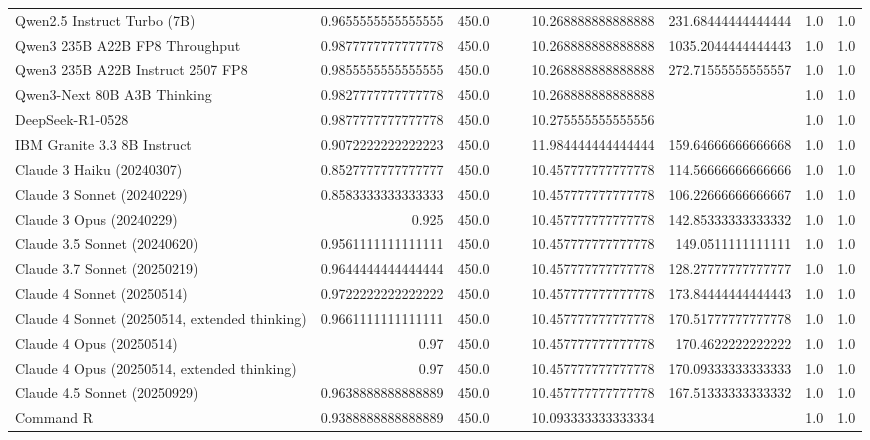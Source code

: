 \begin{table}[htp]
{\begin{tabular}{lrrrrrrrr}
Qwen2.5 Instruct Turbo (7B) & 0.9655555555555555 & 450.0 &  &  & 10.268888888888888 & 231.68444444444444 & 1.0 & 1.0 \\
Qwen3 235B A22B FP8 Throughput & 0.9877777777777778 & 450.0 &  &  & 10.268888888888888 & 1035.2044444444443 & 1.0 & 1.0 \\
Qwen3 235B A22B Instruct 2507 FP8 & 0.9855555555555555 & 450.0 &  &  & 10.268888888888888 & 272.71555555555557 & 1.0 & 1.0 \\
Qwen3-Next 80B A3B Thinking & 0.9827777777777778 & 450.0 &  &  & 10.268888888888888 &  & 1.0 & 1.0 \\
DeepSeek-R1-0528 & 0.9877777777777778 & 450.0 &  &  & 10.275555555555556 &  & 1.0 & 1.0 \\
IBM Granite 3.3 8B Instruct & 0.9072222222222223 & 450.0 &  &  & 11.984444444444444 & 159.64666666666668 & 1.0 & 1.0 \\
Claude 3 Haiku (20240307) & 0.8527777777777777 & 450.0 &  &  & 10.457777777777778 & 114.56666666666666 & 1.0 & 1.0 \\
Claude 3 Sonnet (20240229) & 0.8583333333333333 & 450.0 &  &  & 10.457777777777778 & 106.22666666666667 & 1.0 & 1.0 \\
Claude 3 Opus (20240229) & 0.925 & 450.0 &  &  & 10.457777777777778 & 142.85333333333332 & 1.0 & 1.0 \\
Claude 3.5 Sonnet (20240620) & 0.9561111111111111 & 450.0 &  &  & 10.457777777777778 & 149.0511111111111 & 1.0 & 1.0 \\
Claude 3.7 Sonnet (20250219) & 0.9644444444444444 & 450.0 &  &  & 10.457777777777778 & 128.27777777777777 & 1.0 & 1.0 \\
Claude 4 Sonnet (20250514) & 0.9722222222222222 & 450.0 &  &  & 10.457777777777778 & 173.84444444444443 & 1.0 & 1.0 \\
Claude 4 Sonnet (20250514, extended thinking) & 0.9661111111111111 & 450.0 &  &  & 10.457777777777778 & 170.51777777777778 & 1.0 & 1.0 \\
Claude 4 Opus (20250514) & 0.97 & 450.0 &  &  & 10.457777777777778 & 170.4622222222222 & 1.0 & 1.0 \\
Claude 4 Opus (20250514, extended thinking) & 0.97 & 450.0 &  &  & 10.457777777777778 & 170.09333333333333 & 1.0 & 1.0 \\
Claude 4.5 Sonnet (20250929) & 0.9638888888888889 & 450.0 &  &  & 10.457777777777778 & 167.51333333333332 & 1.0 & 1.0 \\
Command R & 0.9388888888888889 & 450.0 &  &  & 10.093333333333334 &  & 1.0 & 1.0 \\

\end{tabular}}
\end{table}
